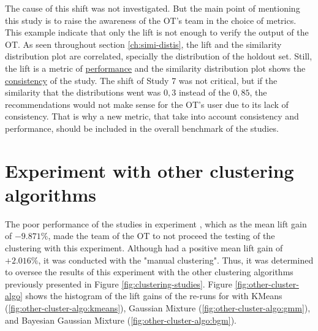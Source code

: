 The cause of this shift was not investigated. But the main point of mentioning this study is to raise the awareness of the OT's team in the choice of metrics. This example indicate that only the lift is not enough to verify the output of the OT. As seen throughout section \ref{ch:simi-distis}, the lift and the similarity distribution plot are correlated, specially the distribution of the holdout set. Still, the lift is a metric of \underline{performance} and the similarity distribution plot shows the \underline{consistency} of the study. The shift of Study 7 was not critical, but if the similarity that the distributions went was $0,3$ instead of the $0,85$, the recommendations would not make sense for the OT's user due to its lack of consistency. That is why a new metric, that take into account consistency and performance, should be included in the overall benchmark of the studies.


\section{Experiment \nameExperimentII{} with other clustering algorithms}

The poor performance of the studies in experiment \nameExperimentI{}, which as the mean lift gain of $-9.871\%$, made the team of the OT to not proceed the testing of the clustering with this experiment. Although \nameExperimentII{} had a positive mean lift gain of $+2.016\%$, it was conducted with the "manual clustering". Thus, it was determined to oversee the results of this experiment with the other clustering algorithms previously presented in Figure \ref{fig:clustering-studies}. Figure \ref{fig:other-cluster-algo} shows the histogram of the lift gains of the re-runs for \nameExperimentII{} with KMeans (\ref{fig:other-cluster-algo:kmeans}), Gaussian Mixture (\ref{fig:other-cluster-algo:gmm}), and Bayesian Gaussian Mixture (\ref{fig:other-cluster-algo:bgm}).

